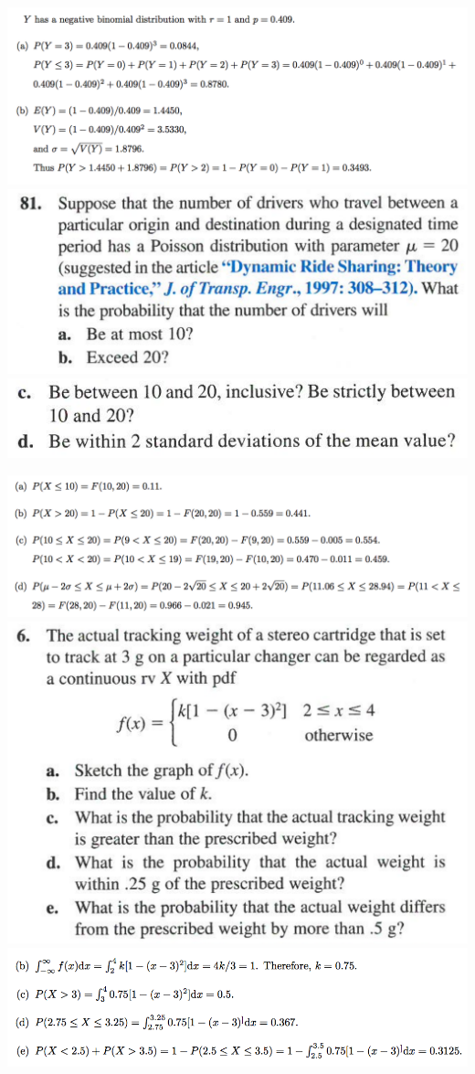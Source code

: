 \documentclass[9pt]{extarticle}
\begin{document}
	\includegraphics[scale=0.5]{78a.png} \includegraphics[scale=0.23]{81_1.png}
	\includegraphics[scale=0.23]{81_2.png}
	
	\includegraphics[scale=0.5]{81_a.png} \includegraphics[scale=0.25]{6.png} \includegraphics[scale=0.3]{6a.png}
	
\end{document}
